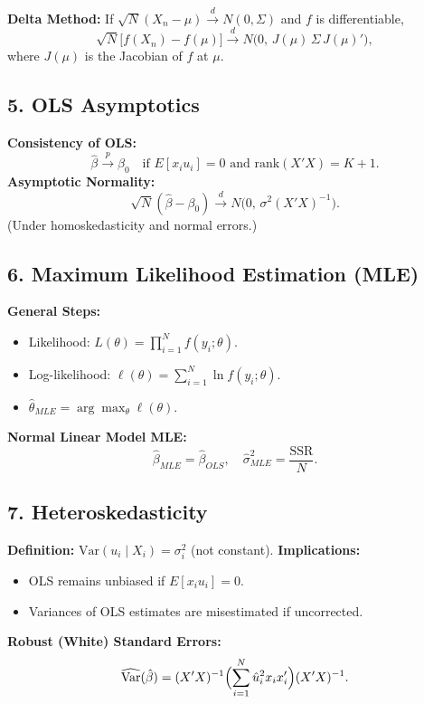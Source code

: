 \documentclass[a4paper,10pt]{article}
\begin{document}
\textbf{Delta Method:}
If $\sqrt{N}(X_n - \mu) \xrightarrow{d} N(0, \Sigma)$ and $f$ is differentiable,
\[
\sqrt{N}\bigl[f(X_n) - f(\mu)\bigr]
 \xrightarrow{d} 
N\bigl(0,\,J(\mu)\,\Sigma\,J(\mu)'\bigr),
\]
where $J(\mu)$ is the Jacobian of $f$ at $\mu$.

\subsection*{5. OLS Asymptotics}
\textbf{Consistency of OLS:}
\[
\hat{\beta} \xrightarrow{p} \beta_0 
\quad \text{if } E[x_i u_i] = 0 \text{ and } 
\mathrm{rank}(X'X) = K+1.
\]
\textbf{Asymptotic Normality:} 
\[
\sqrt{N}(\hat{\beta} - \beta_0) \xrightarrow{d} 
N\bigl(0,\, \sigma^2 (X'X)^{-1}\bigr).
\]
(Under homoskedasticity and normal errors.)

\subsection*{6. Maximum Likelihood Estimation (MLE)}
\textbf{General Steps:}
\begin{itemize}
\item Likelihood: 
  $L(\theta) = \prod_{i=1}^N f(y_i;\theta).$
\item Log-likelihood: 
  $\ell(\theta) = \sum_{i=1}^N \ln f(y_i;\theta).$
\item $\hat{\theta}_{MLE} = \arg\max_{\theta} \ell(\theta).$
\end{itemize}

\textbf{Normal Linear Model MLE:}
\[
\hat{\beta}_{MLE} = \hat{\beta}_{OLS}, 
\quad
\hat{\sigma}_{MLE}^2 = \frac{\mathrm{SSR}}{N}.
\]

\subsection*{7. Heteroskedasticity}
\textbf{Definition:} 
$\mathrm{Var}(u_i \mid X_i) = \sigma_i^2$ (not constant).
\textbf{Implications:}
\begin{itemize}
\item OLS remains unbiased if $E[x_i u_i] = 0$.
\item Variances of OLS estimates are misestimated if uncorrected.
\end{itemize}
\textbf{Robust (White) Standard Errors:}
\[
\widehat{\mathrm{Var}}(\hat{\beta})
= (X'X)^{-1}
\Bigl(\sum_{i=1}^N \hat{u}_i^2 x_i x_i'\Bigr)
(X'X)^{-1}.
\]

\vfill  %
\end{document}
